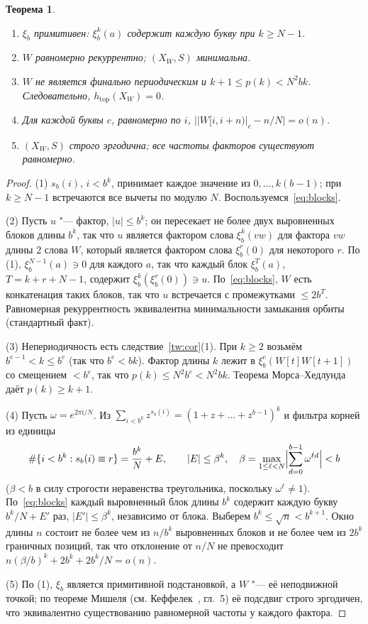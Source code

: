 \documentclass[a4paper,14pt]{extreport}
\theoremstyle{plain}
\newtheorem{theorem}{Теорема}[section]
\theoremstyle{definition}
\theoremstyle{remark}
\begin{document}
\begin{theorem}\label{thm:dynWb}
	\begin{enumerate}
		\item[(1)] $\xi_b$ примитивен: $\xi_b^{k}(a)$ содержит каждую букву при $k\ge N-1$.
		\item[(2)] $W$ равномерно рекуррентно; $(X_W,S)$ минимальна.
		\item[(3)] $W$ не является финально периодическим и $k+1\le p(k)<N^2bk$. Следовательно, $h_{\mathrm{top}}(X_W)=0$.
		\item[(4)] Для каждой буквы $c$, равномерно по $i$, $\bigl||W[i,i+n)|_c-n/N\bigr|=o(n)$.
		\item[(5)] $(X_W,S)$ строго эргодична; все частоты факторов существуют равномерно.
	\end{enumerate}
\end{theorem}
\begin{proof}
	(1) $s_b(i)$, $i<b^k$, принимает каждое значение из $0,\dots,k(b-1)$; при $k\ge N-1$ встречаются все вычеты по модулю $N$.
	Воспользуемся~\eqref{eq:blocks}.
	
	(2) Пусть $u$ "--- фактор, $|u|\le b^k$; он пересекает не более двух выровненных блоков длины $b^k$, так что $u$ является фактором слова $\xi_b^k(vw)$ для
	фактора $vw$ длины $2$ слова $W$, который является фактором слова $\xi_b^r(0)$ для некоторого $r$. По (1), $\xi_b^{N-1}(a)\ni0$ для каждого $a$,
	так что каждый блок $\xi_b^{T}(a)$, $T=k+r+N-1$, содержит $\xi_b^k(\xi_b^r(0))\ni u$. По~\eqref{eq:blocks}, $W$ есть конкатенация таких блоков,
	так что $u$ встречается с промежутками $\le2b^{T}$. Равномерная рекуррентность эквивалентна минимальности замыкания орбиты (стандартный факт).
	
	(3) Непериодичность есть следствие~\ref{tw:cor}(1). При $k\ge2$ возьмём $b^{e-1}<k\le b^e$ (так что $b^e<bk$). Фактор длины $k$ лежит в $\xi_b^e(W[t]W[t+1])$
	со смещением $<b^e$, так что $p(k)\le N^2b^e<N^2bk$. Теорема Морса--Хедлунда даёт $p(k)\ge k+1$.
	
	(4) Пусть $\omega=e^{2\pi\mathrm i/N}$. Из $\sum_{i<b^k}z^{s_b(i)}=(1+z+\dots+z^{b-1})^k$ и фильтра корней из единицы
	\begin{equation}
		\#\{i<b^k:s_b(i)\equiv r\}=\frac{b^k}N+E,\qquad |E|\le\beta^k,\quad
		\beta=\max_{1\le\ell<N}\Bigl|\sum_{d=0}^{b-1}\omega^{\ell d}\Bigr|<b
	\end{equation}
	($\beta<b$ в силу строгости неравенства треугольника, поскольку $\omega^\ell\ne1$). По~\eqref{eq:blocks} каждый выровненный блок длины $b^k$ содержит
	каждую букву $b^k/N+E'$ раз, $|E'|\le\beta^k$, независимо от блока. Выберем $b^k\le\sqrt n<b^{k+1}$.
	Окно длины $n$ состоит не более чем из $n/b^k$ выровненных блоков и не более чем из $2b^k$ граничных позиций, так что
	отклонение от $n/N$ не превосходит $n(\beta/b)^k+2b^k+2b^k/N=o(n)$.
	
	(5) По (1), $\xi_b$ является примитивной подстановкой, а $W$ "--- её неподвижной точкой; по теореме Мишеля (см. Кеффелек~\cite{Queffelec}, гл.~5)
	её подсдвиг строго эргодичен, что эквивалентно существованию равномерной частоты у каждого фактора.
\end{proof}
\end{document}
